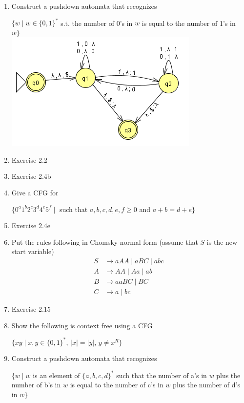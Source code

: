 \documentclass{article}
\begin{document}
\begin{enumerate}
        \item Construct a pushdown automata that recognizes 
            \begin{center}
                $\{w\mid w \in \{0,1\}^* $ s.t. the number of 0's in $ w $ is equal to the number of 1's in $ w \}$\\
                
                \includegraphics[scale=0.6]{machine1}                
            \end{center}
        \item Exercise 2.2

        \item Exercise 2.4b

        \item Give a CFG for
            \begin{center}
                $\{0^a1^b2^c3^d4^e5^f \mid $ such that $ a,b,c,d,e,f\geq 0 $ and $ a+b=d+e \}$
            \end{center}
        
        \item Exercise 2.4e

        \item Put the rules following in Chomsky normal form (assume that $S$ is the new start variable)
            \begin{align*}
                S&\rightarrow aAA \mid aBC \mid abc\\
                A&\rightarrow AA \mid Aa \mid ab\\
                B&\rightarrow aaBC \mid BC\\
                C&\rightarrow a\mid bc
            \end{align*}
        
        \item Exercise 2.15

        \item Show the following is context free using a CFG
            \begin{center}
                $\{xy \mid x,y\in \{0,1\}^*$, $ |x|=|y|$, $ y\not= x^R\}$
            \end{center}

        \item Construct a pushdown automata that recognizes
            \begin{center}
                $\{w\mid w $ is an element of $\{a,b,c,d\}^* $ such that the number of a's in $w$ plus the number of b's in $w$ is equal to the number of c's in $w$ plus the number of d's in $w \}$
            \end{center}
    \end{enumerate}
\end{document}
